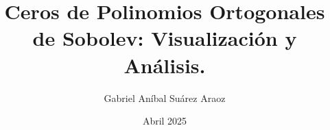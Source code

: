 
\newcommand{\Estudios}{Grado}

\newcommand{\TituloEstudios}{Matemáticas e Informática}

\newcommand{\Departamento}{Departamento de Matemática Aplicada a las Tecnologías de la Información y las Comunicaciones}

\newcommand{\NombreAutor}{Gabriel Aníbal Suárez Araoz}

\newcommand{\NombreTutor}{María Del Carmen Escribano Iglesias y Raquel Natividad Gonzalo Palomar}

\newcommand{\TituloTFG}{Ceros de Polinomios Ortogonales de Sobolev: Visualización y Análisis.}

\newcommand{\Fecha}{Abril 2025}

\title{\TituloTFG}
\author{\NombreAutor}
\date{\Fecha}

